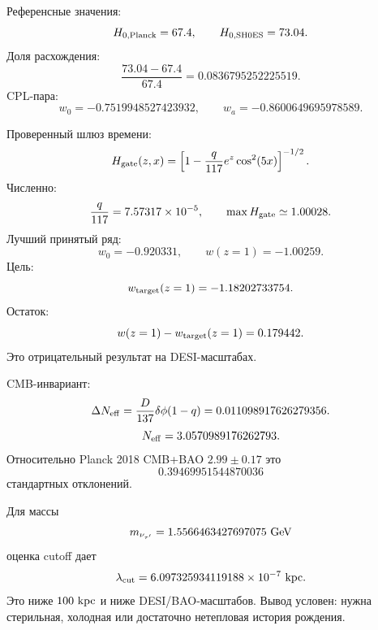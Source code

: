 \documentclass[11pt]{article}
\begin{document}
Референсные значения:
\begin{equation}
    H_{0,\rm Planck}=67.4,
    \qquad
    H_{0,\rm SH0ES}=73.04.
\end{equation}
Доля расхождения:
\begin{equation}
    \frac{73.04-67.4}{67.4}=0.0836795252225519.
\end{equation}
CPL-пара:
\begin{equation}
    w_0=-0.7519948527423932,
    \qquad
    w_a=-0.8600649695978589.
\end{equation}

Проверенный шлюз времени:
\begin{equation}
    H_{\rm gate}(z,x)
    =
    \left[
        1-\frac{q}{117}e^z\cos^2(5x)
    \right]^{-1/2}.
\end{equation}
Численно:
\begin{equation}
    \frac{q}{117}=7.57317\times10^{-5},
    \qquad
    \max H_{\rm gate}\simeq1.00028.
\end{equation}
Лучший принятый ряд:
\begin{equation}
    w_0=-0.920331,\qquad w(z=1)=-1.00259.
\end{equation}
Цель:
\begin{equation}
    w_{\rm target}(z=1)=-1.18202733754.
\end{equation}
Остаток:
\begin{equation}
    w(z=1)-w_{\rm target}(z=1)=0.179442.
\end{equation}
Это отрицательный результат на DESI-масштабах.

CMB-инвариант:
\begin{equation}
    \Delta N_{\rm eff}
    =
    \frac{D}{137}\delta\phi(1-q)
    =
    0.011098917626279356.
\end{equation}
\begin{equation}
    N_{\rm eff}=3.0570989176262793.
\end{equation}
Относительно Planck 2018 CMB+BAO $2.99\pm0.17$ это
\begin{equation}
    0.39469951544870036
\end{equation}
стандартных отклонений.

Для массы
\begin{equation}
    m_{\nu_{\tau'}}=1.5566463427697075~{\rm GeV}
\end{equation}
оценка cutoff дает
\begin{equation}
    \lambda_{\rm cut}
    =
    6.097325934119188\times10^{-7}~{\rm kpc}.
\end{equation}
Это ниже $100~{\rm kpc}$ и ниже DESI/BAO-масштабов.  Вывод условен: нужна
стерильная, холодная или достаточно нетепловая история рождения.
\end{document}
